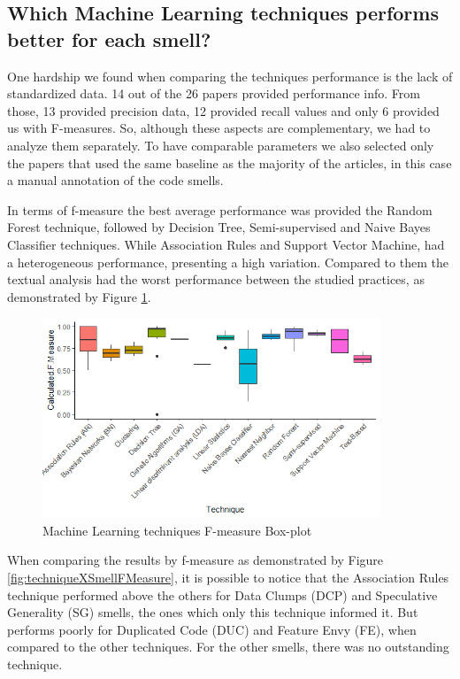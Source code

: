 \subsection{Which Machine Learning techniques performs better for each smell?}

One hardship we found when comparing the techniques performance is the lack of standardized data. 14 out of the 26 papers provided performance info. From those, 13 provided precision data, 12 provided recall values and only 6 provided us with F-measures. So, although these aspects are complementary, we had to analyze them separately. To have comparable parameters we also selected only the papers that used the same baseline as the majority of the articles, in this case a manual annotation of the code smells.

In terms of f-measure the best average performance was provided the Random Forest technique, followed by Decision Tree, Semi-supervised and Naive Bayes Classifier techniques. While Association Rules and Support Vector Machine, had a heterogeneous performance, presenting a high variation. Compared to them the textual analysis had the worst performance between the studied practices, as demonstrated by Figure \ref{fig:fmeasureByTechniques}.

\begin{figure}[!ht] 
    \centering
	\caption{Machine Learning techniques F-measure Box-plot}
	\label{fig:fmeasureByTechniques}
	\includegraphics[width=0.9\textwidth]{imagens/fmeasureByTechniques.png}
\end{figure}

When comparing the results by f-measure as demonstrated by Figure \ref{fig:techniqueXSmellFMeasure}, it is possible to notice that the Association Rules technique performed above the others for Data Clumps (DCP) and Speculative Generality (SG) smells, the ones which only this technique informed it. But performs poorly for Duplicated Code (DUC) and Feature Envy (FE), when compared to the other techniques. For the other smells, there was no outstanding technique.

